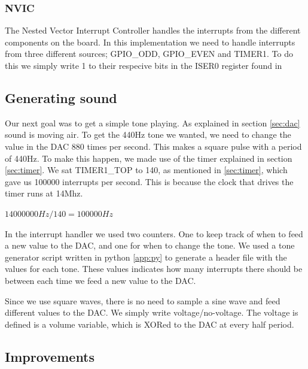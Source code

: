 \subsubsection{NVIC}
The Nested Vector Interrupt Controller handles the interrupts from the different components on the board. In this implementation we need to handle interrupts from three different sources; GPIO\_ODD, GPIO\_EVEN and TIMER1. To do this we simply write 1 to their respecive bits in the ISER0 register found in \citep{interrupt}

\subsection{Generating sound}
\label{sec:generating}
Our next goal was to get a simple tone playing. As explained in section \ref{sec:dac} sound is moving air. To get the 440Hz tone we wanted, we need to change the value in the DAC 880 times per second. This makes a square pulse with a period of 440Hz.
To make this happen, we made use of the timer explained in section
\ref{sec:timer}. We sat TIMER1\_TOP to 140, as mentioned in \ref{sec:timer}, which gave us 100000 interrupts per second. This is because the clock that drives the timer runs at 14Mhz.

\begin{center}
$14000000Hz/140=100000Hz$
\end{center}

In the interrupt handler we used two counters. One to keep track of when to feed a new value to the DAC, and one for when to change the tone.
We used a tone generator script written in python \ref{app:py} to generate a header file with the values for each tone. These values indicates how many interrupts there should be between each time we feed a new value to the DAC.

Since we use square waves, there is no need to sample a sine wave and feed different values to the DAC. We simply write voltage/no-voltage. The voltage is defined is a volume variable, which is XORed to the DAC at every half period. 

\subsubsection{}

\subsection{Improvements}

